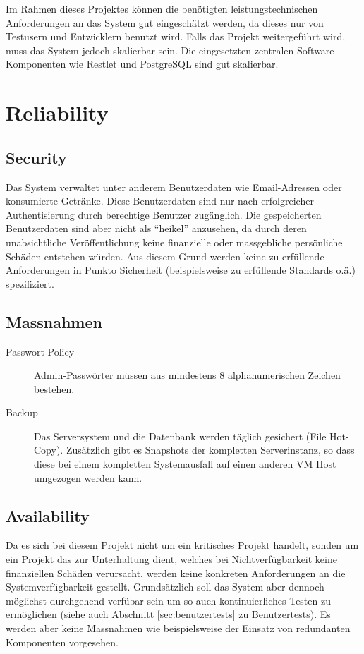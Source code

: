 \documentclass[10pt,a4paper]{scrartcl}
\begin{document}
Im Rahmen dieses Projektes können die benötigten leistungstechnischen Anforderungen an das System gut eingeschätzt werden, da dieses nur von Testusern und Entwicklern benutzt wird. Falls das Projekt weitergeführt wird, muss das System jedoch skalierbar sein. Die eingesetzten zentralen Software-Komponenten wie Restlet und PostgreSQL sind gut skalierbar\cite{smith2010postgresql}.


\section{Reliability}

	\subsection{Security}

	Das System verwaltet unter anderem Benutzerdaten wie Email-Adressen oder konsumierte Getränke. Diese Benutzerdaten sind nur nach erfolgreicher Authentisierung durch berechtige Benutzer zugänglich. Die gespeicherten Benutzerdaten sind aber nicht als ``heikel'' anzusehen, da durch deren unabsichtliche Veröffentlichung keine finanzielle oder massgebliche persönliche Schäden entstehen würden. Aus diesem Grund werden keine zu erfüllende Anforderungen in Punkto Sicherheit (beispielsweise zu erfüllende Standards o.ä.) spezifiziert.

	\subsection{Massnahmen}

	\begin{description}
		\item[Passwort Policy]
			Admin-Passwörter müssen aus mindestens 8 alphanumerischen Zeichen bestehen.
		\item[Backup]
			Das Serversystem und die Datenbank werden täglich gesichert (File Hot-Copy).
			Zusätzlich gibt es Snapshots der kompletten Serverinstanz, so dass diese bei einem kompletten Systemausfall auf einen anderen VM Host umgezogen werden kann.
	\end{description}

	\subsection{Availability}

	Da es sich bei diesem Projekt nicht um ein kritisches Projekt handelt, sonden um ein Projekt das zur Unterhaltung dient, welches bei Nichtverfügbarkeit keine finanziellen Schäden verursacht, werden keine konkreten Anforderungen an die Systemverfügbarkeit gestellt. Grundsätzlich soll das System aber dennoch möglichst durchgehend verfübar sein um so auch kontinuierliches Testen zu ermöglichen (siehe auch Abschnitt \ref{sec:benutzertests} zu Benutzertests). Es werden aber keine Massnahmen wie beispielsweise der Einsatz von redundanten Komponenten vorgesehen.
\end{document}
